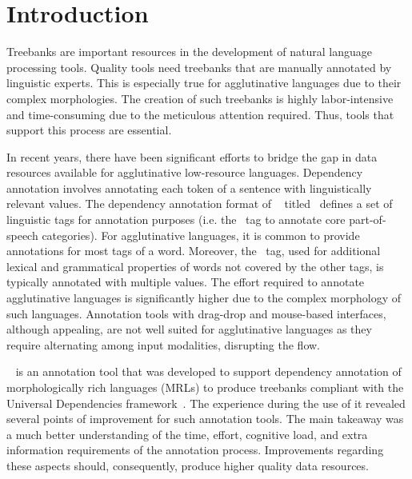 \section{Introduction}
\label{sec:introduction}

Treebanks are important resources in the development of natural language processing tools.
Quality tools need treebanks that are manually annotated by linguistic experts.
This is especially true for agglutinative languages due to their complex morphologies.
The creation of such treebanks is highly labor-intensive and time-consuming due to the meticulous attention required.
Thus, tools that support this process are essential.

In recent years, there have been significant efforts to bridge the gap in data resources available for agglutinative low-resource languages.
Dependency annotation involves annotating each token of a sentence with linguistically relevant values.
The dependency annotation format of \ud~\cite{UD} titled \conll\ defines a set of linguistic tags for annotation purposes (i.e. the \upos\ tag to annotate core part-of-speech categories).
For agglutinative languages, it is common to provide annotations for most tags of a word.
Moreover, the \feats\ tag, used for additional lexical and grammatical properties of words not covered by the other tags, is typically annotated with multiple values.
The effort required to annotate agglutinative languages is significantly higher due to the complex morphology of such languages.
Annotation tools with drag-drop and mouse-based interfaces, although appealing, are not well suited for agglutinative languages as they require alternating among input modalities, disrupting the flow.

\boatvone~\cite{turk2021resources} is an annotation tool that was developed to support dependency annotation of morphologically rich languages (MRLs) to produce treebanks compliant with the Universal Dependencies framework~\cite{UD}.
The experience during the use of it revealed several points of improvement for such annotation tools.
The main takeaway was a much better understanding of the time, effort, cognitive load, and extra information requirements of the annotation process.
Improvements regarding these aspects should, consequently, produce higher quality data resources.

